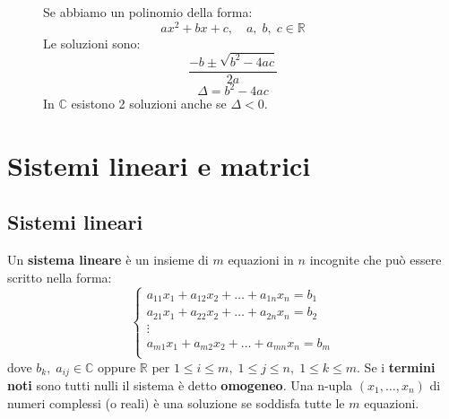 \documentclass[a4paper]{article}
\theoremstyle{break}
\theoremstyle{break}
\theoremstyle{break}
\theoremstyle{break}
\begin{document}
\begin{figure}[H]
	\begin{define}
		Se abbiamo un polinomio della forma:
		\[
			ax^2 + bx + c, \quad a,\;b,\;c \in \mathbb{R}
		\]
		Le soluzioni sono:
		\[
			\frac{-b \pm \sqrt{b^2 -4ac}}{2a}
		\]
		\[
			\Delta = b^2 - 4ac
		\]
		In \( \mathbb{C} \) esistono 2 soluzioni anche se \( \Delta < 0 \).
	\end{define}
\end{figure}

\section{Sistemi lineari e matrici}
\subsection{Sistemi lineari}
Un \textbf{sistema lineare} è un insieme di \( m \) equazioni in \( n \) incognite
che può essere scritto nella forma:
\[
	\begin{cases}
		a_{11}x_1 + a_{12}x_2 + \ldots + a_{1n}x_n = b_1 \\
		a_{21}x_1 + a_{22}x_2 + \ldots + a_{2n}x_n = b_2 \\
		\vdots                                           \\
		a_{m1}x_1 + a_{m2}x_2 + \ldots + a_{mn}x_n = b_m \\
	\end{cases}
\]
dove \( b_k,\; a_{ij} \in \mathbb{C} \) oppure \( \mathbb{R} \) per \( 1 \le i \le m,\;
1 \le j \le n,\; 1 \le k \le m\). Se i \textbf{termini noti} sono tutti nulli il sistema è detto
\textbf{omogeneo}. Una n-upla \( (x_1, \ldots, x_n) \) di numeri complessi (o reali) è
una soluzione se soddisfa tutte le \( m \) equazioni.
\end{document}
